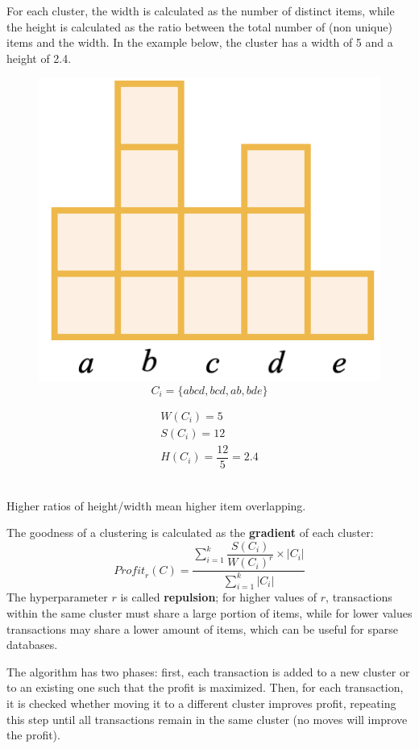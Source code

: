 For each cluster, the width is calculated as the number of distinct items, while the height is calculated as the ratio between the total number of (non unique) items and the width. In the example below, the cluster has a width of 5 and a height of 2.4.
\begin{figure}[h]
    \centering
    \begin{minipage}{0.49\textwidth}
    \centering
    \includegraphics[width=0.5\linewidth]{img/CLOPE_cluster.png}
    \begin{equation*}
        C_i = \{abcd, bcd, ab, bde\}
    \end{equation*}
    \end{minipage}
\hfill
    \begin{minipage}{0.49\textwidth}
        \begin{gather*}
            W(C_i) = 5 \\
            S(C_i) = 12 \\
            H(C_i) = \dfrac{12}{5} = 2.4
        \end{gather*}
    \end{minipage}
\end{figure} \\
Higher ratios of height/width mean higher item overlapping.

The goodness of a clustering is calculated as the \textbf{gradient} of each cluster:
\begin{equation*}
    \textit{Profit}_r(C) = \dfrac{\sum_{i=1}^k \dfrac{S(C_i)}{W(C_i)^r} \times |C_i|}{\sum_{i=1}^k |C_i|}
\end{equation*}
The hyperparameter $r$ is called \textbf{repulsion}; for higher values of $r$, transactions within the same cluster must share a large portion of items, while for lower values transactions may share a lower amount of items, which can be useful for sparse databases.

The algorithm has two phases: first, each transaction is added to a new cluster or to an existing one such that the profit is maximized. Then, for each transaction, it is checked whether moving it to a different cluster improves profit, repeating this step until all transactions remain in the same cluster (no moves will improve the profit).

